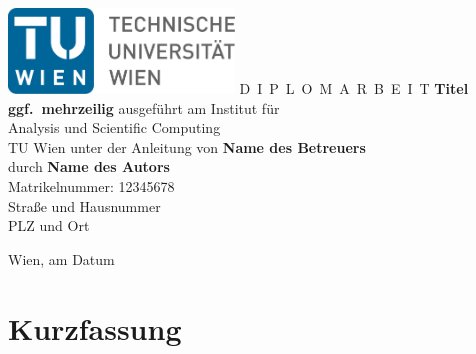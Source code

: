\documentclass[a4paper,11pt,bibliography=totoc,listof=totoc,headinclude=true,cleardoublepage=empty,oneside]{NumPDEsThesis}
\begin{document}


\begin{titlepage}
  \begin{center}
    \includegraphics[width=0.45\textwidth]{figures/TULogo.pdf}
    \vskip 1cm
      {\LARGE D~\Large I~P~L~O~M~A~R~B~E~I~T}
    \vskip 8mm
      {\huge\bfseries\color{change}Titel \\[1ex] ggf.\ mehrzeilig}
    \vskip 1cm
    \large
    ausgef\"uhrt am
    \vskip 0.75cm
      {\Large Institut f\"ur\\[1ex] Analysis und Scientific Computing}\\[1ex]
    {\Large TU Wien}
    \vskip0.75cm
    unter der Anleitung von
    \vskip0.75cm
    {\Large\bfseries\color{change}Name des Betreuers}\\[1ex]
    \vskip 0.5cm
    durch
    \vskip 0.5cm
      {\Large\bfseries\color{change}Name des Autors}\\[1ex]
    Matrikelnummer: {\color{change}12345678}\\[1ex]
    {\color{change}Straße und Hausnummer}\\[1ex]
    {\color{change}PLZ und Ort}
  \end{center}

  \vfill

  \small
  Wien, am {\color{change} Datum} %
  \vspace*{-15mm}
\end{titlepage}

\cleardoublepage


\chapter*{Kurzfassung}
\thispagestyle{empty}
\end{document}
